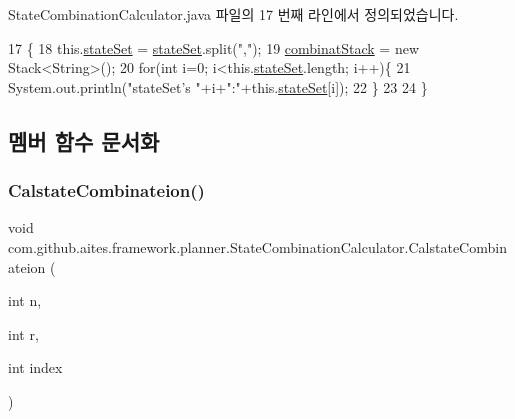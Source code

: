 State\+Combination\+Calculator.\+java 파일의 17 번째 라인에서 정의되었습니다.


\begin{DoxyCode}
17                                                       \{
18         this.\mbox{\hyperlink{classcom_1_1github_1_1aites_1_1framework_1_1planner_1_1_state_combination_calculator_af0002d5e5c2d3034f606f4586d7796a8}{stateSet}} = \mbox{\hyperlink{classcom_1_1github_1_1aites_1_1framework_1_1planner_1_1_state_combination_calculator_af0002d5e5c2d3034f606f4586d7796a8}{stateSet}}.split(\textcolor{stringliteral}{","});
19         \mbox{\hyperlink{classcom_1_1github_1_1aites_1_1framework_1_1planner_1_1_state_combination_calculator_a9c0cc6dedc79509276f6afd36ffbfa6c}{combinatStack}} = \textcolor{keyword}{new} Stack<String>();
20         \textcolor{keywordflow}{for}(\textcolor{keywordtype}{int} i=0; i<this.\mbox{\hyperlink{classcom_1_1github_1_1aites_1_1framework_1_1planner_1_1_state_combination_calculator_af0002d5e5c2d3034f606f4586d7796a8}{stateSet}}.length; i++)\{
21             System.out.println(\textcolor{stringliteral}{"stateSet's "}+i+\textcolor{stringliteral}{":"}+this.\mbox{\hyperlink{classcom_1_1github_1_1aites_1_1framework_1_1planner_1_1_state_combination_calculator_af0002d5e5c2d3034f606f4586d7796a8}{stateSet}}[i]);
22         \}
23         
24     \}
\end{DoxyCode}


\subsection{멤버 함수 문서화}
\mbox{\label{classcom_1_1github_1_1aites_1_1framework_1_1planner_1_1_state_combination_calculator_aace63fc6e53cff5e89bbc163a2eb94ef}} 
\subsubsection{\texorpdfstring{Calstate\+Combinateion()}{CalstateCombinateion()}}
{\footnotesize\ttfamily void com.\+github.\+aites.\+framework.\+planner.\+State\+Combination\+Calculator.\+Calstate\+Combinateion (\begin{DoxyParamCaption}\item[{int}]{n,  }\item[{int}]{r,  }\item[{int}]{index }\end{DoxyParamCaption})}



